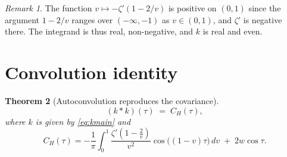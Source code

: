 \documentclass[11pt,reqno]{amsart}
\newtheorem{theorem}{Theorem}[section]
\theoremstyle{definition}
\theoremstyle{remark}
\newtheorem{remark}[theorem]{Remark}
\begin{document}
\begin{remark}
The function \(v \mapsto -\zeta'(1-2/v)\) is positive on \((0,1)\)
since the argument \(1-2/v\) ranges over \((-\infty,-1)\) as
\(v\in(0,1)\), and \(\zeta'\) is negative there. The integrand is thus
real, non-negative, and \(k\) is real and even.
\end{remark}

\section{Convolution identity}

\begin{theorem}[Autoconvolution reproduces the covariance]\label{thm:conv}
\begin{equation}\label{eq:convmain}
  (k * k)(\tau) \;=\; C_H(\tau),
\end{equation}
where \(k\) is given by \eqref{eq:kmain} and
\begin{equation}\label{eq:CH}
  C_H(\tau)
  = -\frac{1}{\pi}
    \int_0^1
    \frac{\zeta'\!\left(1-\tfrac{2}{v}\right)}{v^2}
    \cos\!\bigl((1-v)\tau\bigr)\,dv
    \;+\; 2w\cos\tau.
\end{equation}
\end{theorem}
\end{document}
